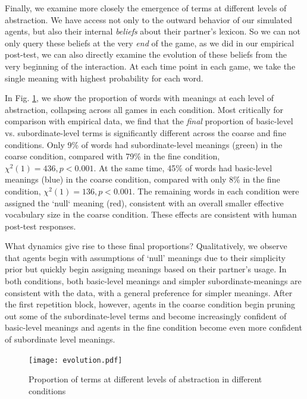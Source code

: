 Finally, we examine more closely the emergence of terms at different levels of abstraction.
We have access not only to the outward behavior of our simulated agents, but also their internal \emph{beliefs} about their partner's lexicon.
So we can not only query these beliefs at the very \emph{end} of the game, as we did in our empirical post-test, we can also directly examine the evolution of these beliefs from the very beginning of the interaction.
At each time point in each game, we take the single meaning with highest probability for each word.

In Fig. \ref{fig:evolution}, we show the proportion of words with meanings at each level of abstraction, collapsing across all games in each condition.
Most critically for comparison with empirical data, we find that the \emph{final} proportion of basic-level vs. subordinate-level terms is significantly different across the coarse and fine conditions.
Only 9\% of words had subordinate-level meanings (green) in the coarse condition, compared with 79\% in the fine condition, $\chi^2(1) = 436, p < 0.001$.
At the same time, 45\% of words had basic-level meanings (blue) in the coarse condition, compared with only 8\% in the fine condition, $\chi^2(1) = 136, p < 0.001$.
The remaining words in each condition were assigned the `null` meaning (red), consistent with an overall smaller effective vocabulary size in the coarse condition.
These effects are consistent with human post-test responses.

What dynamics give rise to these final proportions?
Qualitatively, we observe that agents begin with assumptions of `null' meanings due to their simplicity prior but quickly begin assigning meanings based on their partner's usage.
In both conditions, both basic-level meanings and simpler subordinate-meanings are consistent with the data, with a general preference for simpler meanings.
After the first repetition block, however, agents in the coarse condition begin pruning out some of the subordinate-level terms and become increasingly confident of basic-level meanings and agents in the fine condition become even more confident of subordinate level meanings. 

\begin{figure}[t]
\begin{center}
\texttt{[image: evolution.pdf]}
\caption{Proportion of terms at different levels of abstraction in different conditions }
\label{fig:evolution}
\end{center}
\end{figure}


